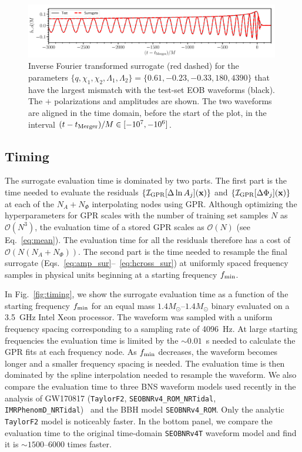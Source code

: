 \documentclass[prd,aps,letter,twocolumn,floatfix,notitlepage,nofootinbib]{revtex4-1}
\def\bx{\mathbf{x}}
\begin{document}
\begin{figure}[htb]
\centering
\includegraphics[width=0.99\textwidth]{hmaxerror.pdf}
\caption{Inverse Fourier transformed surrogate (red dashed) for the parameters $\{q, \chi_1, \chi_2, \Lambda_1, \Lambda_2\} = \{0.61, -0.23, -0.33, 180, 4390\}$ that have the largest mismatch with the test-set EOB waveforms (black). The $+$ polarizations and amplitudes are shown. The two waveforms are aligned in the time domain, before the start of the plot, in the interval $(t-t_{\rm Merger})/M \in [-10^7, -10^6]$.}
\label{fig:maxmismatchtd}
\end{figure}


\subsection{Timing}

The surrogate evaluation time is dominated by two parts. The first part is the time needed to evaluate the residuals $\{\mathcal{I}_{\rm GPR}[\Delta\ln A_j](\bx)\}$ and $\{\mathcal{I}_{\rm GPR}[\Delta\Phi_j](\bx)\}$ at each of the $N_A+N_\Phi$ interpolating nodes using GPR. Although optimizing the hyperparameters for GPR scales with the number of training set samples $N$ as $\mathcal{O}(N^3)$, the evaluation time of a stored GPR scales as $\mathcal{O}(N)$ (see Eq.~\eqref{eq:mean}). The evaluation time for all the residuals therefore has a cost of $\mathcal{O}(N(N_A+N_\Phi))$. The second part is the time needed to resample the final surrogate (Eqs.~\eqref{eq:amp_sur}--~\eqref{eq:hcross_sur}) at uniformly spaced frequency samples in physical units beginning at a starting frequency $f_{\rm min}$. 

In Fig.~\ref{fig:timing}, we show the surrogate evaluation time as a function of the starting frequency $f_{\rm min}$ for an equal mass $1.4M_\odot$--$1.4M_\odot$ binary evaluated on a 3.5~GHz Intel Xeon processor. The waveform was sampled with a uniform frequency spacing corresponding to a sampling rate of 4096~Hz. At large starting frequencies the evaluation time is limited by the $\sim 0.01$~s needed to calculate the GPR fits at each frequency node. As $f_{\rm min}$ decreases, the waveform becomes longer and a smaller frequency spacing is needed. The evaluation time is then dominated by the spline interpolation needed to resample the waveform. We also compare the evaluation time to three BNS waveform models used recently in the analysis of GW170817 (\texttt{TaylorF2}, \texttt{SEOBNRv4\_ROM\_NRTidal}, \texttt{IMRPhenomD\_NRTidal})~\cite{BNSPE} and the BBH model \texttt{SEOBNRv4\_ROM}. Only the analytic \texttt{TaylorF2} model is noticeably faster. In the bottom panel, we compare the evaluation time to the original time-domain \texttt{SEOBNRv4T} waveform model and find it is $\sim 1500$--6000 times faster.
\end{document}
